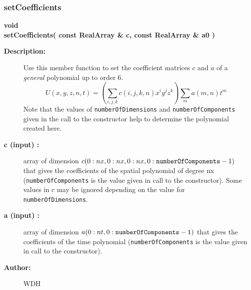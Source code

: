 \subsubsection{setCoefficients}
 
\begin{flushleft} \textbf{%
void  \\ 
\settowidth{\OGPolyFunctionIncludeArgIndent}{setCoefficients(}%
setCoefficients( const RealArray \& c, const RealArray \& a0 )
}\end{flushleft}
\begin{description}
\item[{\bf Description:}]  Use this member function to set the coefficient matrices $c$ and $a$  
 of a {\it general} polynomial up to order 6.
 \[
    U(x,y,z,n,t) = ( \sum_{i,j,k} c(i,j,k,n) x^i y^j z^k ) \sum_m a(m,n) t^m
 \]
  Note that the values of {\tt numberOfDimensions} and
 {\tt numberOfComponents} given in the call to the constructor help to determine the polynomial
 created here.

\item[{\bf c (input) :}]  array of dimension $c(0:nx,0:nx,0:nx,0:{\tt numberOfComponents}-1)$ that gives the
   coefficients of the spatial polynomial of degree nx
   ({\tt numberOfComponents} is the value given in call to the constructor).
   Some values in c may be ignored depending on the value for {\tt numberOfDimensions}.
\item[{\bf a (input) :}]  array of dimension $a(0:nt,0:{\tt numberOfComponents-1})$ that gives the coefficients
   of the time polynomial ({\tt numberOfComponents} is the value given in call to the constructor).

\item[{\bf Author:}]  WDH
\end{description}
